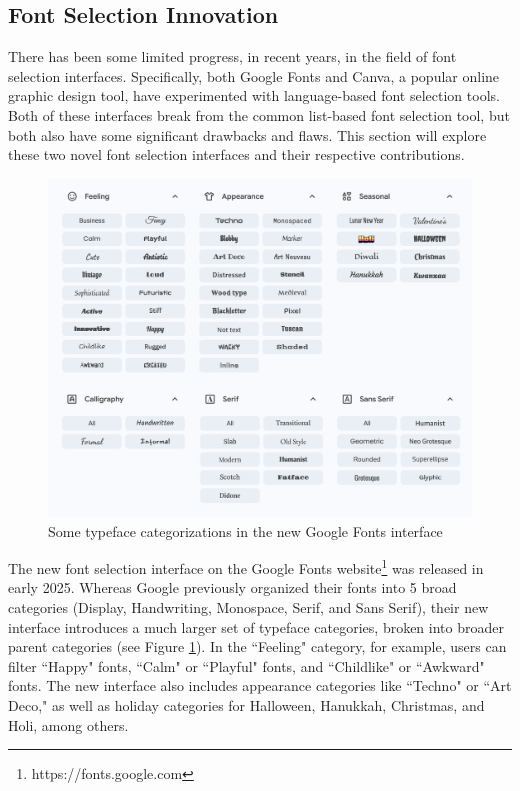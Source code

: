 \subsection{Font Selection Innovation} \label{font-selection-innovation}

There has been some limited progress, in recent years, in the field of font selection interfaces. Specifically, both Google Fonts and Canva, a popular online graphic design tool, have experimented with language-based font selection tools. Both of these interfaces break from the common list-based font selection tool, but both also have some significant drawbacks and flaws. This section will explore these two novel font selection interfaces and their respective contributions.

\begin{figure}[H]
    \centering
    \includegraphics[width=.85\textwidth]{images/google-font-categories.png}
    \caption{Some typeface categorizations in the new Google Fonts interface}
    \label{fig:google-font-categories}
\end{figure}

The new font selection interface on the Google Fonts website\footnote{https://fonts.google.com} was released in early 2025. Whereas Google previously organized their fonts into 5 broad categories (Display, Handwriting, Monospace, Serif, and Sans Serif), their new interface introduces a much larger set of typeface categories, broken into broader parent categories (see Figure \ref{fig:google-font-categories}). In the ``Feeling" category, for example, users can filter ``Happy" fonts, ``Calm" or ``Playful" fonts, and ``Childlike" or ``Awkward" fonts. The new interface also includes appearance categories like ``Techno" or ``Art Deco," as well as holiday categories for Halloween, Hanukkah, Christmas, and Holi, among others.

